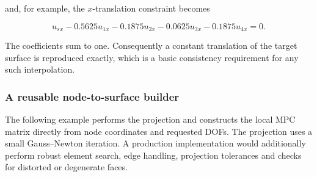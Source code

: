 and, for example, the $x$-translation constraint becomes

\begin{equation}\label{mfc-node-surface-worked-row}
    u_{sx}
    -0.5625u_{1x}
    -0.1875u_{2x}
    -0.0625u_{3x}
    -0.1875u_{4x}=0.
\end{equation}

The coefficients sum to one. Consequently a constant translation of the target
surface is reproduced exactly, which is a basic consistency requirement for any
such interpolation.

\subsubsection{A reusable node-to-surface builder}

The following example performs the projection and constructs the local MPC
matrix directly from node coordinates and requested DOFs. The projection uses a
small Gauss--Newton iteration. A production implementation would additionally
perform robust element search, edge handling, projection tolerances and checks
for distorted or degenerate faces.

